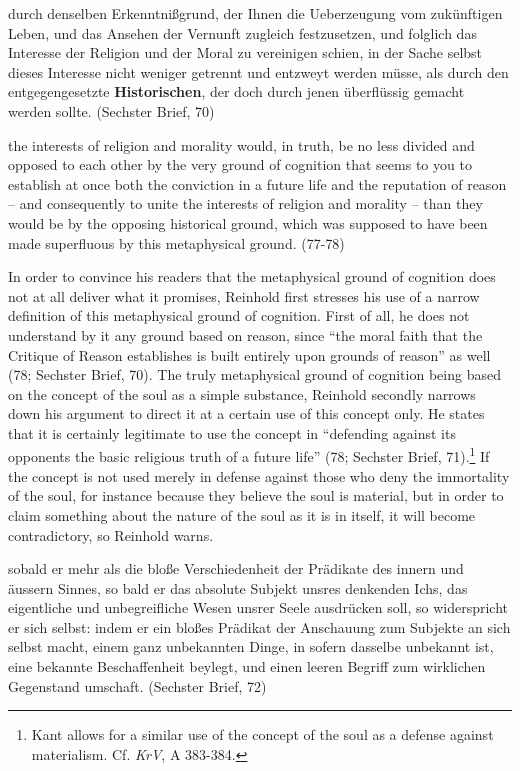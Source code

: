 durch denselben Erkenntni\ss{}grund, der Ihnen die Ueberzeugung vom zuk\"{u}nftigen Leben, und das Ansehen der Vernunft zugleich festzusetzen, und folglich das Interesse der Religion und der Moral zu vereinigen schien, in der Sache selbst dieses Interesse nicht weniger getrennt und entzweyt werden m\"{u}sse, als durch den entgegengesetzte \textbf{Historischen}, der doch durch jenen \"{u}berfl\"{u}ssig gemacht werden sollte. (Sechster Brief, 70)

the interests of religion and morality would, in truth, be no less divided and opposed to each other by the very ground of cognition that seems to you to establish at once both the conviction in a future life and the reputation of reason {--} and consequently to unite the interests of religion and morality {--} than they would be by the opposing historical ground, which was supposed to have been made superfluous by this metaphysical ground. (77{-}78)

In order to convince his readers that the metaphysical ground of cognition does not at all deliver what it promises, Reinhold first stresses his use of a narrow definition of this metaphysical ground of cognition. First of all, he does not understand by it any ground based on reason, since ``the moral faith that the Critique of Reason establishes is built entirely upon grounds of reason'' as well (78; Sechster Brief, 70). The truly metaphysical ground of cognition being based on the concept of the soul as a simple substance, Reinhold secondly narrows down his argument to direct it at a certain use of this concept only. He states that it is certainly legitimate to use the concept in ``defending against its opponents the basic religious truth of a future life'' (78; Sechster Brief, 71).\footnote{ Kant allows for a similar use of the concept of the soul as a defense against materialism. Cf. \textit{KrV}, A 383{-}384.} If the concept is not used merely in defense against those who deny the immortality of the soul, for instance because they believe the soul is material, but in order to claim something about the nature of the soul as it is in itself, it will become contradictory, so Reinhold warns. 

sobald er mehr als die blo\ss{}e Verschiedenheit der Pr\"{a}dikate des innern und \"{a}ussern Sinnes, so bald er das absolute Subjekt unsres denkenden Ichs, das eigentliche und unbegreifliche Wesen unsrer Seele ausdr\"{u}cken soll, so widerspricht er sich selbst: indem er ein blo\ss{}es Pr\"{a}dikat der Anschauung zum Subjekte an sich selbst macht, einem ganz unbekannten Dinge, in sofern dasselbe unbekannt ist, eine bekannte Beschaffenheit beylegt, und einen leeren Begriff zum wirklichen Gegenstand umschaft. (Sechster Brief, 72)

